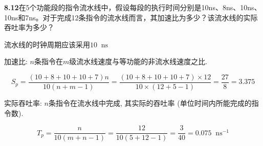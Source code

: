 \documentclass[UTF8]{report}
\newcommand*{\unit}[1]{\mathop{}\!\mathrm{#1}}
\newcommand{\problem}[1]{{\setlength{\parskip}{10pt}\noindent \bf{#1}}}
\newenvironment{solution}{{\noindent\hskip 2em \bf 解 \quad}}{}
\begin{document}
\problem{8.12}在5个功能段的指令流水线中，假设每段的执行时间分别是10ns、8ns、10ns、10ns和7ns。对于完成12条指令的流水线而言，其加速比为多少？该流水线的实际吞吐率为多少？

\begin{solution}
    流水线的时钟周期应该采用$10\unit{ns}$

    加速比: $n$条指令在$m$级流水线速度与等功能的非流水线速度之比. 

    \[
        S_p = \frac{(10+8+10+10+7)n}{10(n+m-1)} = \frac{(10+8+10+10+7) \times 12}{10 \times (12+5-1)} = \frac{27}{8} = 3.375
    \]

    实际吞吐率: $n$条指令在流水线中完成, 其实际的吞吐率 (单位时间内所能完成的指令数).

    \[
        T_p = \frac{n}{10(m+n-1)} = \frac{12}{10(5+12-1)} = \frac{3}{40} = 0.075 \unit{ns^{-1}}
    \]
\end{solution}
\end{document}
